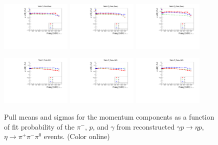 \begin{figure}[tbp]
\begin{center}
\includegraphics[width=0.3\textwidth]{figures/gluex_nim_pullspx_pulls_sigma_data.pdf}
\includegraphics[width=0.3\textwidth]{figures/gluex_nim_pullspy_pulls_sigma_data.pdf}
\includegraphics[width=0.3\textwidth]{figures/gluex_nim_pullspz_pulls_sigma_data.pdf}

\includegraphics[width=0.3\textwidth]{figures/gluex_nim_pullspx_pulls_sigma_mc.pdf}
\includegraphics[width=0.3\textwidth]{figures/gluex_nim_pullspy_pulls_sigma_mc.pdf}
\includegraphics[width=0.3\textwidth]{figures/gluex_nim_pullspz_pulls_sigma_mc.pdf}

\caption{\label{fig:kinfitstudy}
Pull means and sigmas for the momentum components as a function of fit probability of the $\pi^-$, $p$, and $\gamma$ from reconstructed $\gamma p \to \eta p$,  $\eta \to \pi^+\pi^-\pi^0$ events.
 (Color online)}
\end{center}
\end{figure}

